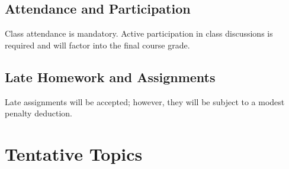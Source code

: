 \documentclass[
]{article}
\begin{document}
\hypertarget{attendance-and-participation}{%
\subsection{Attendance and
Participation}\label{attendance-and-participation}}

Class attendance is mandatory. Active participation in class discussions
is required and will factor into the final course grade.

\hypertarget{late-homework-and-assignments}{%
\subsection{Late Homework and
Assignments}\label{late-homework-and-assignments}}

Late assignments will be accepted; however, they will be subject to a
modest penalty deduction.

\hypertarget{tentative-topics}{%
\section{Tentative Topics}\label{tentative-topics}}
\end{document}
